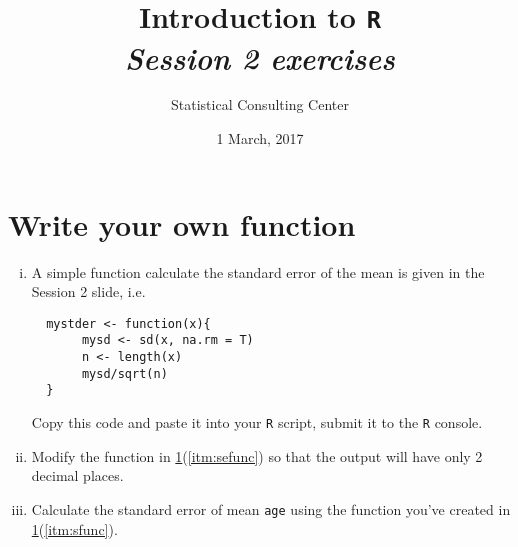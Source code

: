 \documentclass[12pt,a4paper]{article}
\begin{document}
\setlength\parindent{0cm}
\title{\Large{\textbf{Introduction to \texttt{R}}}\\
\textit{Session 2 exercises}}
\author{Statistical Consulting Center}
\date{1 March, 2017}
\maketitle
 

\section{Write your own function}
\label{sec:func}
\begin{enumerate}[(i)]
  \item\label{itm:sefunc} A simple function  calculate the standard
    error of the mean is given in the Session 2 slide, i.e.
  \begin{verbatim}
  mystder <- function(x){
       mysd <- sd(x, na.rm = T)
       n <- length(x)
       mysd/sqrt(n)
  }
  \end{verbatim}
  Copy this code and paste it into your \texttt{R} script, submit it
  to the \texttt{R} console. 
  \item \label{itm:sfunc} Modify the function in
    \ref{sec:func}(\ref{itm:sefunc})  
    so that the output will have only 2 decimal places.
  \item Calculate the standard error of mean \texttt{age} using the
    function you've created in \ref{sec:func}(\ref{itm:sfunc}).
\end{enumerate}
\end{document}

